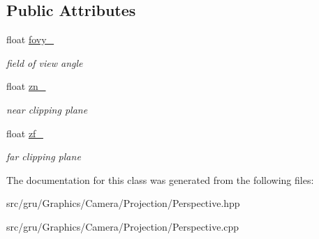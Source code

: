 \subsection*{\-Public \-Attributes}
\begin{DoxyCompactItemize}
\item 
\hypertarget{classglutpp_1_1Camera_1_1Projection_1_1Perspective_adbbd4f2e6c7c1d4028195680bcd88756}{float \hyperlink{classglutpp_1_1Camera_1_1Projection_1_1Perspective_adbbd4f2e6c7c1d4028195680bcd88756}{fovy\-\_\-}}\label{classglutpp_1_1Camera_1_1Projection_1_1Perspective_adbbd4f2e6c7c1d4028195680bcd88756}

\begin{DoxyCompactList}\small\item\em field of view angle \end{DoxyCompactList}\item 
\hypertarget{classglutpp_1_1Camera_1_1Projection_1_1Perspective_a873fea74faea3fcee819e92534b3ea59}{float \hyperlink{classglutpp_1_1Camera_1_1Projection_1_1Perspective_a873fea74faea3fcee819e92534b3ea59}{zn\-\_\-}}\label{classglutpp_1_1Camera_1_1Projection_1_1Perspective_a873fea74faea3fcee819e92534b3ea59}

\begin{DoxyCompactList}\small\item\em near clipping plane \end{DoxyCompactList}\item 
\hypertarget{classglutpp_1_1Camera_1_1Projection_1_1Perspective_aa3301a764cbcc06f9640f982525c2480}{float \hyperlink{classglutpp_1_1Camera_1_1Projection_1_1Perspective_aa3301a764cbcc06f9640f982525c2480}{zf\-\_\-}}\label{classglutpp_1_1Camera_1_1Projection_1_1Perspective_aa3301a764cbcc06f9640f982525c2480}

\begin{DoxyCompactList}\small\item\em far clipping plane \end{DoxyCompactList}\end{DoxyCompactItemize}


\-The documentation for this class was generated from the following files\-:\begin{DoxyCompactItemize}
\item 
src/gru/\-Graphics/\-Camera/\-Projection/\-Perspective.\-hpp\item 
src/gru/\-Graphics/\-Camera/\-Projection/\-Perspective.\-cpp\end{DoxyCompactItemize}
